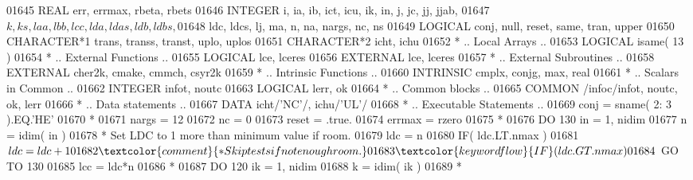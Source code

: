 \begin{DoxyCode}
01645       \textcolor{keywordtype}{REAL}               err, errmax, rbeta, rbets
01646       \textcolor{keywordtype}{INTEGER}            i, ia, ib, ict, icu, ik, in, j, jc, jj, jjab,
01647      $                   k, ks, laa, lbb, lcc, lda, ldas, ldb, ldbs,
01648      $                   ldc, ldcs, lj, ma, n, na, nargs, nc, ns
01649       \textcolor{keywordtype}{LOGICAL}            conj, null, reset, same, tran, upper
01650       \textcolor{keywordtype}{CHARACTER*1}        trans, transs, transt, uplo, uplos
01651       \textcolor{keywordtype}{CHARACTER*2}        icht, ichu
01652 \textcolor{comment}{*     .. Local Arrays ..}
01653       \textcolor{keywordtype}{LOGICAL}            isame( 13 )
01654 \textcolor{comment}{*     .. External Functions ..}
01655       \textcolor{keywordtype}{LOGICAL}            lce, lceres
01656       \textcolor{keywordtype}{EXTERNAL}           lce, lceres
01657 \textcolor{comment}{*     .. External Subroutines ..}
01658       \textcolor{keywordtype}{EXTERNAL}           cher2k, cmake, cmmch, csyr2k
01659 \textcolor{comment}{*     .. Intrinsic Functions ..}
01660       \textcolor{keywordtype}{INTRINSIC}          cmplx, conjg, max, real
01661 \textcolor{comment}{*     .. Scalars in Common ..}
01662       \textcolor{keywordtype}{INTEGER}            infot, noutc
01663       \textcolor{keywordtype}{LOGICAL}            lerr, ok
01664 \textcolor{comment}{*     .. Common blocks ..}
01665       \textcolor{keyword}{COMMON}             /infoc/infot, noutc, ok, lerr
01666 \textcolor{comment}{*     .. Data statements ..}
01667       \textcolor{keyword}{DATA}               icht/\textcolor{stringliteral}{'NC'}/, ichu/\textcolor{stringliteral}{'UL'}/
01668 \textcolor{comment}{*     .. Executable Statements ..}
01669       conj = sname( 2: 3 ).EQ.\textcolor{stringliteral}{'HE'}
01670 \textcolor{comment}{*}
01671       nargs = 12
01672       nc = 0
01673       reset = .true.
01674       errmax = rzero
01675 \textcolor{comment}{*}
01676       \textcolor{keywordflow}{DO} 130 in = 1, nidim
01677          n = idim( in )
01678 \textcolor{comment}{*        Set LDC to 1 more than minimum value if room.}
01679          ldc = n
01680          \textcolor{keywordflow}{IF}( ldc.LT.nmax )
01681      $      ldc = ldc + 1
01682 \textcolor{comment}{*        Skip tests if not enough room.}
01683          \textcolor{keywordflow}{IF}( ldc.GT.nmax )
01684      $      \textcolor{keywordflow}{GO TO} 130
01685          lcc = ldc*n
01686 \textcolor{comment}{*}
01687          \textcolor{keywordflow}{DO} 120 ik = 1, nidim
01688             k = idim( ik )
01689 \textcolor{comment}{*}

\end{DoxyCode}
